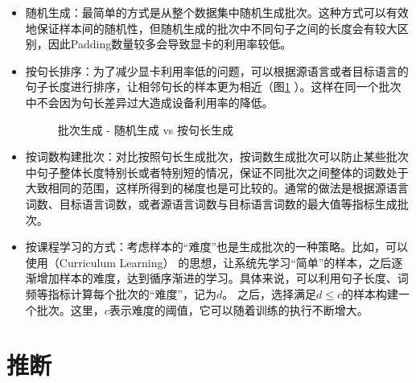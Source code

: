 \begin{itemize}
\vspace{0.5em}
\item 随机生成：最简单的方式是从整个数据集中随机生成批次。这种方式可以有效地保证样本间的随机性，但随机生成的批次中不同句子之间的长度会有较大区别，因此Padding数量较多会导致显卡的利用率较低。
\vspace{0.5em}
\item 按句长排序：为了减少显卡利用率低的问题，可以根据源语言或者目标语言的句子长度进行排序，让相邻句长的样本更为相近（图\ref{fig:7-18} ）。这样在同一个批次中不会因为句长差异过大造成设备利用率的降低。

\begin{figure}[htp]
\centering

\caption{批次生成 - 随机生成 vs 按句长生成}
\label{fig:7-18}
\end{figure}

\vspace{0.5em}
\item 按词数构建批次：对比按照句长生成批次，按词数生成批次可以防止某些批次中句子整体长度特别长或者特别短的情况，保证不同批次之间整体的词数处于大致相同的范围，这样所得到的梯度也是可比较的。通常的做法是根据源语言词数、目标语言词数，或者源语言词数与目标语言词数的最大值等指标生成批次。

\vspace{0.5em}
\item 按课程学习的方式：考虑样本的``难度''也是生成批次的一种策略。比如，可以使用{\small{}}（Curriculum Learning） 的思想\cite{DBLP:conf/icml/BengioLCW09}，让系统先学习``简单''的样本，之后逐渐增加样本的难度，达到循序渐进的学习。具体来说，可以利用句子长度、词频等指标计算每个批次的``难度''，记为$d$。 之后，选择满足$d \leq c$的样本构建一个批次。这里，$c$表示难度的阈值，它可以随着训练的执行不断增大。
\vspace{0.5em}
\end{itemize}


\sectionnewpage
\section{推断}

